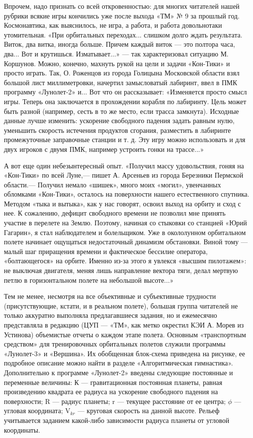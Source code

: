 \documentclass[11pt,a4paper,oneside]{article}
\begin{document}
Впрочем, надо признать со всей откровенностью: для многих читателей нашей рубрики всякие игры кончились уже после выхода «ТМ» № 9 за прошлый год. Космонавтика, как выяснилось, не игра, а работа, и работа довольнотаки утомительная. «При орбитальных переходах... слишком долго ждать результата. Виток, два витка, иногда больше. Причем каждый виток — это полтора часа, два... Вот и крутишься. Изматывает...» — так характеризовал ситуацию М. Коршунов. Можно, конечно, махнуть рукой на цели и задачи «Кон-Тики» и просто играть. Так, О. Роженцов из города Голицына Московской области взял большой лист миллиметровки, начертил замысловатый лабиринт, ввел в ПМК программу «Лунолет-2» и... Вот что он рассказывает: «Изменяется просто смысл игры. Теперь она заключается в прохождении корабля по лабиринту. Цель может быть разной (например, сесть в то же место, если трасса замкнута). Исходные данные лучше изменить: ускорение свободного падения задать равным нулю, уменьшить скорость истечения продуктов сгорания, разместить в лабиринте промежуточные заправочные станции и т. д. Эту игру можно использовать и для двух игроков с двумя ПМК, например устроить гонки на трассе...»

А вот еще один небезынтересный опыт. «Получил массу удовольствия, гоняя на «Кон-Тики» по всей Луне,— пишет А. Арсеньев из города Березники Пермской области.— Получил немало «шишек», много моих «могил», увенчанных обломками «Кон-Тики», осталось на поверхности нашего естественного спутника. Методом «тыка и вытыка», как у нас говорят, освоил выход на орбиту и сход с нее. К сожалению, дефицит свободного времени не позволил мне принять участие в перелете на Землю. Поэтому, начиная со стыковки со станцией «Юрий Гагарин», я стал наблюдателем и болельщиком. Уже в окололунном орбитальном полете начинает ощущаться недостаточный динамизм обстановки. Виной тому — малый шаг приращения времени и фактическое бессилие оператора, «болтающегося» на орбите. Именно из-за этого я увлекся «высшим пилотажем»: не выключая двигателя, меняя лишь направление вектора тяги, делал мертвую петлю в горизонтальном полете на небольшой высоте...»

Тем не менее, несмотря на все объективные и субъективные трудности (присутствующие, кстати, и в реальном полете), большая группа читателей не только аккуратно выполняла предлагавшиеся задания, но и ежемесячно представляла в редакцию (ЦУП — «ТМ», как метко окрестил КЭИ А. Морев из Устинова) объемистые отчеты о каждом этапе полета. Основным «транспортным средством» для тренировочных орбитальных полетов служили программы «Лунолет-3» и «Вершина». Их обобщенная блок-схема приведена на рисунке, ее подробное описание можно найти в разделе «Алгоритмическая гимнастика». Дополнительно к программе «Лунолет-2» введены следующие постоянные и переменные величины: К — гравитационная постоянная планеты, равная произведению квадрата ее радиуса на ускорение свободного падения на поверхности; R — радиус планеты; r — текущее расстояние от ее центра; $\phi$ — угловая координата; V$_{kr}$ — круговая скорость на данной высоте. Рельеф учитывается заданием какой-либо зависимости радиуса планеты от угловой координаты.
\end{document}
